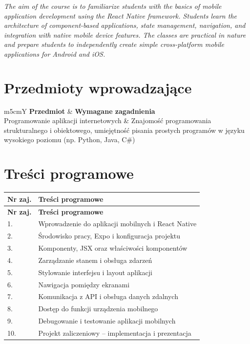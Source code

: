 \documentclass[12pt, a4paper]{article}
\newcommand{\thdrule}{\noalign{\global\setlength{\extrarowheight}{0pt}}}
\newcommand{\thdend}{\noalign{\global\setlength{\extrarowheight}{3pt}}}
\begin{document}
\textit{The aim of the course is to familiarize students with the basics of mobile application development using the React Native framework. Students learn the architecture of component-based applications, state management, navigation, and integration with native mobile device features. The classes are practical in nature and prepare students to independently create simple cross-platform mobile applications for Android and iOS.}


\section{Przedmioty wprowadzające}

{\scriptsize
\begin{tabularx}{\textwidth}{m{5cm}Y}
\thdrule\toprule
{} {\color{white}\textbf{Przedmiot}} & {\color{white}\textbf{Wymagane zagadnienia}} \\
\midrule\thdend
   Programowanie aplikacji internetowych & Znajomość programowania strukturalnego i obiektowego, umiejętność pisania prostych programów w języku wysokiego poziomu (np. Python, Java, C\#) \\
\bottomrule
\end{tabularx}}

\section{Treści programowe}

{\scriptsize
\begin{longtable}{m{1.5cm}m{14.5cm}}
\thdrule\toprule
\rowcolor{pjatkRed} {\color{white}\textbf{Nr zaj.}} & {\color{white}\textbf{Treści programowe}} \\
\midrule\thdend
\endfirsthead
\thdrule\toprule
\rowcolor{pjatkRed} {\color{white}\textbf{Nr zaj.}} & {\color{white}\textbf{Treści programowe}} \\
\midrule\thdend
\endhead
  \rowcolor{tableRowLight} 1. & Wprowadzenie do aplikacji mobilnych i React Native \\
  \rowcolor{tableRowAlt} 2. & Środowisko pracy, Expo i konfiguracja projektu \\
  \rowcolor{tableRowLight} 3. & Komponenty, JSX oraz właściwości komponentów \\
  \rowcolor{tableRowAlt} 4. & Zarządzanie stanem i obsługa zdarzeń \\
  \rowcolor{tableRowLight} 5. & Stylowanie interfejsu i layout aplikacji \\
  \rowcolor{tableRowAlt} 6. & Nawigacja pomiędzy ekranami \\
  \rowcolor{tableRowLight} 7. & Komunikacja z API i obsługa danych zdalnych \\
  \rowcolor{tableRowAlt} 8. & Dostęp do funkcji urządzenia mobilnego \\
  \rowcolor{tableRowLight} 9. & Debugowanie i testowanie aplikacji mobilnych \\
  \rowcolor{tableRowAlt} 10. & Projekt zaliczeniowy – implementacja i prezentacja \\
\bottomrule
\end{longtable}}
\end{document}
